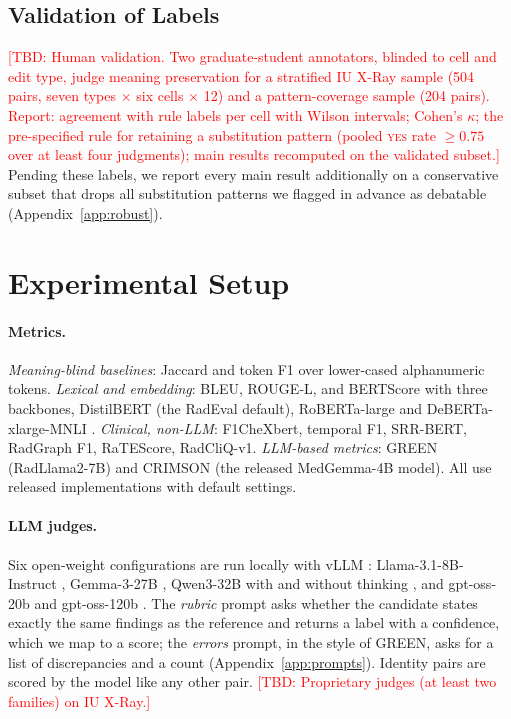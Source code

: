 \documentclass[11pt]{article}
\newcommand{\tbd}[1]{\textcolor{red}{[TBD: #1]}}
\begin{document}
\subsection{Validation of Labels}
\label{sec:human}

\tbd{Human validation. Two graduate-student annotators, blinded to cell and edit type, judge meaning preservation for a stratified IU X-Ray sample (504 pairs, seven types $\times$ six cells $\times$ 12) and a pattern-coverage sample (204 pairs). Report: agreement with rule labels per cell with Wilson intervals; Cohen's $\kappa$; the pre-specified rule for retaining a substitution pattern (pooled \textsc{yes} rate $\ge 0.75$ over at least four judgments); main results recomputed on the validated subset.}
Pending these labels, we report every main result additionally on a conservative subset that drops all substitution patterns we flagged in advance as debatable (Appendix~\ref{app:robust}).

\section{Experimental Setup}

\paragraph{Metrics.}
\emph{Meaning-blind baselines}: Jaccard and token F1 over lower-cased alphanumeric tokens. \emph{Lexical and embedding}: BLEU, ROUGE-L, and BERTScore with three backbones, DistilBERT \citep{sanh-etal-2019-distilbert} (the RadEval default), RoBERTa-large \citep{liu-etal-2019-roberta} and DeBERTa-xlarge-MNLI \citep{he-etal-2021-deberta}. \emph{Clinical, non-LLM}: F1CheXbert, temporal F1, SRR-BERT, RadGraph F1, RaTEScore, RadCliQ-v1. \emph{LLM-based metrics}: GREEN (RadLlama2-7B) and CRIMSON (the released MedGemma-4B model). All use released implementations with default settings.

\paragraph{LLM judges.}
Six open-weight configurations are run locally with vLLM \citep{kwon-etal-2023-vllm}: Llama-3.1-8B-Instruct \citep{llama3-2024}, Gemma-3-27B \citep{gemma3-2025}, Qwen3-32B with and without thinking \citep{qwen3-2025}, and gpt-oss-20b and gpt-oss-120b \citep{gptoss-2025}. The \emph{rubric} prompt asks whether the candidate states exactly the same findings as the reference and returns a label with a confidence, which we map to a score; the \emph{errors} prompt, in the style of GREEN, asks for a list of discrepancies and a count (Appendix~\ref{app:prompts}). Identity pairs are scored by the model like any other pair. \tbd{Proprietary judges (at least two families) on IU X-Ray.}
\end{document}
